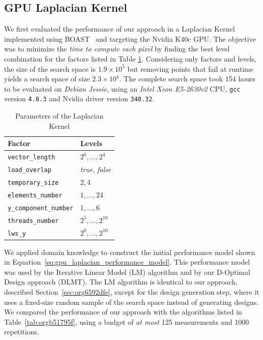 \documentclass[conference]{IEEEtran}
\begin{document}
\subsection{GPU Laplacian Kernel}
\label{sec:org0fd1952}
We first evaluated the performance of our approach in a Laplacian Kernel
implemented using BOAST~\cite{videau2017boast} and targeting the Nvidia
K40c GPU. The objective was to minimize the \emph{time to compute each pixel} by
finding the best level combination for the factors listed in Table
\ref{tab:org3f00f67}. Considering only factors and levels, the size of the
search space is \(1.9\times10^5\) but removing points that fail at runtime yields
a search space of size \(2.3\times10^4\). The complete search space took 154 hours
to be evaluated on \emph{Debian Jessie}, using an \emph{Intel Xeon E5-2630v2} CPU,
\texttt{gcc} version \texttt{4.8.3} and Nvidia driver version \texttt{340.32}.

\begin{table}[ht]
\caption{\label{tab:org3f00f67}
Parameters of the Laplacian Kernel}
\centering
\footnotesize
\begin{tabular}{ll}
\toprule
Factor & Levels\\
\midrule
\texttt{vector\_length} & \(2^0,\dots,2^4\)\\
\texttt{load\_overlap} & \textit{true}, \textit{false}\\
\texttt{temporary\_size} & \(2,4\)\\
\texttt{elements\_number} & \(1,\dots,24\)\\
\texttt{y\_component\_number} & \(1,\dots,6\)\\
\texttt{threads\_number} & \(2^5,\dots,2^{10}\)\\
\texttt{lws\_y} & \(2^0,\dots,2^{10}\)\\
\bottomrule
\end{tabular}
\end{table}

We applied domain knowledge to construct the initial performance model shown in
Equation~\eqref{eq:gpu_laplacian_performance_model}. This performance model
was used by the Iterative Linear Model (LM) algorithm and by our D-Optimal
Design approach (DLMT). The LM algorithm is identical to our approach, described
Section~\ref{sec:org6592dfe}, except for the design
generation step, where it uses a fixed-size random sample of the search space
instead of generating designs. We compared the performance of our approach with
the algorithms listed in Table~\ref{tab:orgb51795f}, using a
budget of \emph{at most} 125 measurements and 1000 repetitions.
\end{document}
